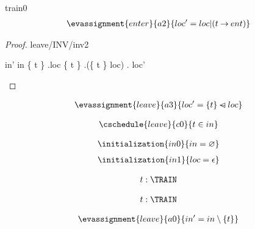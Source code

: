 \documentclass[12pt]{amsart}
\begin{document}
\begin{machine}{train0}
\begin{align*}
\evassignment{enter}{a2}
{	loc' = loc | (t \tfun ent)	}
\end{align*}

\begin{proof}{leave/INV/inv2}
	\begin{calculation}
		in'
	\hint{=}{ \ref{a0} }
		in \setminus \{ t \}
	\hint{=}{ \ref{inv2} }
		\dom.loc \setminus \{ t \}
		\dom.(\{ t \} \domsub loc)
	\hint{=}{ \ref{a3} } 
		\dom. loc' 
	\end{calculation}
\end{proof}

\begin{align*}
\evassignment{leave}{a3}
{	loc' = \{ t \} \domsub loc 	}
\end{align*}

\begin{align*}
\cschedule{leave}{c0}
{	t \in in	}
\end{align*}

\begin{align*}
\initialization{in0}
{	in = \emptyset	}
\end{align*}
\begin{align*}
\initialization{in1}
{	loc = \emptyfun	}
\end{align*}

\begin{use:set}{\TRAIN} \end{use:set}
\begin{use:set}{\LOC} \end{use:set}
\begin{use:set}{\BLK} \end{use:set}
\begin{use:fun}{\TRAIN}{\BLK} \end{use:fun}

\begin{align*}
\indices{leave}{	t: \TRAIN}
\end{align*}

\begin{align*}
\indices{enter}{	t: \TRAIN}
\end{align*}

\begin{align*}
\evassignment{leave}{a0}
{	in' = in \setminus \{ t \}	}
\end{align*}


\end{machine}
\end{document}
